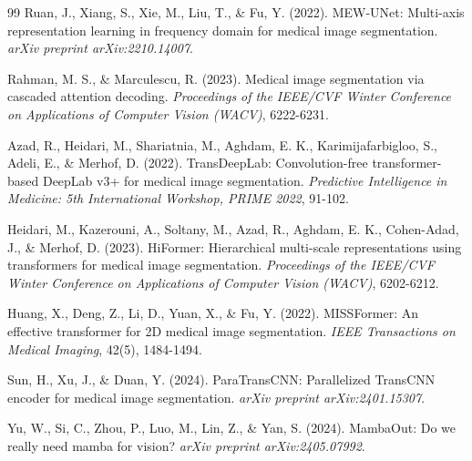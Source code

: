 \documentclass[letterpaper, 10 pt, conference]{ieeeconf}  %
\begin{document}
\begin{thebibliography}{99}
Ruan, J., Xiang, S., Xie, M., Liu, T., \& Fu, Y. (2022). MEW-UNet: Multi-axis representation learning in frequency domain for medical image segmentation. \textit{arXiv preprint arXiv:2210.14007}.

Rahman, M. S., \& Marculescu, R. (2023). Medical image segmentation via cascaded attention decoding. \textit{Proceedings of the IEEE/CVF Winter Conference on Applications of Computer Vision (WACV)}, 6222-6231.

Azad, R., Heidari, M., Shariatnia, M., Aghdam, E. K., Karimijafarbigloo, S., Adeli, E., \& Merhof, D. (2022). TransDeepLab: Convolution-free transformer-based DeepLab v3+ for medical image segmentation. \textit{Predictive Intelligence in Medicine: 5th International Workshop, PRIME 2022}, 91-102.

Heidari, M., Kazerouni, A., Soltany, M., Azad, R., Aghdam, E. K., Cohen-Adad, J., \& Merhof, D. (2023). HiFormer: Hierarchical multi-scale representations using transformers for medical image segmentation. \textit{Proceedings of the IEEE/CVF Winter Conference on Applications of Computer Vision (WACV)}, 6202-6212.

Huang, X., Deng, Z., Li, D., Yuan, X., \& Fu, Y. (2022). MISSFormer: An effective transformer for 2D medical image segmentation. \textit{IEEE Transactions on Medical Imaging}, 42(5), 1484-1494.

Sun, H., Xu, J., \& Duan, Y. (2024). ParaTransCNN: Parallelized TransCNN encoder for medical image segmentation. \textit{arXiv preprint arXiv:2401.15307}.




Yu, W., Si, C., Zhou, P., Luo, M., Lin, Z., \& Yan, S. (2024). MambaOut: Do we really need mamba for vision? \textit{arXiv preprint arXiv:2405.07992}.





\end{thebibliography}
\end{document}
